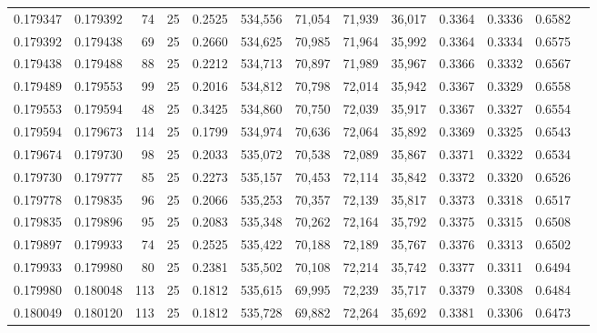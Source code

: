 \begin{tabular}{rrrrrrrrrrrrr}
0.179347 & 0.179392 &    74 &  25 &                                     0.2525 & 534,556 &  71,054 &  71,939 &  36,017 & 0.3364 & 0.3336 & 0.6582 \\
0.179392 & 0.179438 &    69 &  25 &                                     0.2660 & 534,625 &  70,985 &  71,964 &  35,992 & 0.3364 & 0.3334 & 0.6575 \\
0.179438 & 0.179488 &    88 &  25 &                                     0.2212 & 534,713 &  70,897 &  71,989 &  35,967 & 0.3366 & 0.3332 & 0.6567 \\
0.179489 & 0.179553 &    99 &  25 &                                     0.2016 & 534,812 &  70,798 &  72,014 &  35,942 & 0.3367 & 0.3329 & 0.6558 \\
0.179553 & 0.179594 &    48 &  25 &                                     0.3425 & 534,860 &  70,750 &  72,039 &  35,917 & 0.3367 & 0.3327 & 0.6554 \\
0.179594 & 0.179673 &   114 &  25 &                                     0.1799 & 534,974 &  70,636 &  72,064 &  35,892 & 0.3369 & 0.3325 & 0.6543 \\
0.179674 & 0.179730 &    98 &  25 &                                     0.2033 & 535,072 &  70,538 &  72,089 &  35,867 & 0.3371 & 0.3322 & 0.6534 \\
0.179730 & 0.179777 &    85 &  25 &                                     0.2273 & 535,157 &  70,453 &  72,114 &  35,842 & 0.3372 & 0.3320 & 0.6526 \\
0.179778 & 0.179835 &    96 &  25 &                                     0.2066 & 535,253 &  70,357 &  72,139 &  35,817 & 0.3373 & 0.3318 & 0.6517 \\
0.179835 & 0.179896 &    95 &  25 &                                     0.2083 & 535,348 &  70,262 &  72,164 &  35,792 & 0.3375 & 0.3315 & 0.6508 \\
0.179897 & 0.179933 &    74 &  25 &                                     0.2525 & 535,422 &  70,188 &  72,189 &  35,767 & 0.3376 & 0.3313 & 0.6502 \\
0.179933 & 0.179980 &    80 &  25 &                                     0.2381 & 535,502 &  70,108 &  72,214 &  35,742 & 0.3377 & 0.3311 & 0.6494 \\
0.179980 & 0.180048 &   113 &  25 &                                     0.1812 & 535,615 &  69,995 &  72,239 &  35,717 & 0.3379 & 0.3308 & 0.6484 \\
0.180049 & 0.180120 &   113 &  25 &                                     0.1812 & 535,728 &  69,882 &  72,264 &  35,692 & 0.3381 & 0.3306 & 0.6473 \\

\end{tabular}
